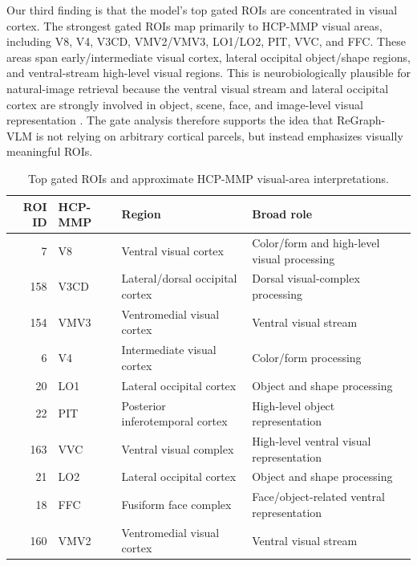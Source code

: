 \documentclass{article}
\begin{document}
Our third finding is that the model's top gated ROIs are concentrated in visual cortex. The strongest gated ROIs map primarily to HCP-MMP visual areas, including V8, V4, V3CD, VMV2/VMV3, LO1/LO2, PIT, VVC, and FFC. These areas span early/intermediate visual cortex, lateral occipital object/shape regions, and ventral-stream high-level visual regions. This is neurobiologically plausible for natural-image retrieval because the ventral visual stream and lateral occipital cortex are strongly involved in object, scene, face, and image-level visual representation \citep{malach1995loc,kanwisher1997ffa,grill2014visual}. The gate analysis therefore supports the idea that ReGraph-VLM is not relying on arbitrary cortical parcels, but instead emphasizes visually meaningful ROIs.

\begin{table}[!htbp]
  \centering
  \caption{
  Top gated ROIs and approximate HCP-MMP visual-area interpretations.
  }
  \label{tab:top_gated_roi_names}
  \scriptsize
  \setlength{\tabcolsep}{4pt}
  \renewcommand{\arraystretch}{1.15}
  \begin{tabularx}{\linewidth}{r l X X}
    \toprule
    ROI ID & HCP-MMP & Region & Broad role \\
    \midrule
    7   & V8   & Ventral visual cortex & Color/form and high-level visual processing \\
    158 & V3CD & Lateral/dorsal occipital cortex & Dorsal visual-complex processing \\
    154 & VMV3 & Ventromedial visual cortex & Ventral visual stream \\
    6   & V4   & Intermediate visual cortex & Color/form processing \\
    20  & LO1  & Lateral occipital cortex & Object and shape processing \\
    22  & PIT  & Posterior inferotemporal cortex & High-level object representation \\
    163 & VVC  & Ventral visual complex & High-level ventral visual representation \\
    21  & LO2  & Lateral occipital cortex & Object and shape processing \\
    18  & FFC  & Fusiform face complex & Face/object-related ventral representation \\
    160 & VMV2 & Ventromedial visual cortex & Ventral visual stream \\
    \bottomrule
  \end{tabularx}
\end{table}
\end{document}
